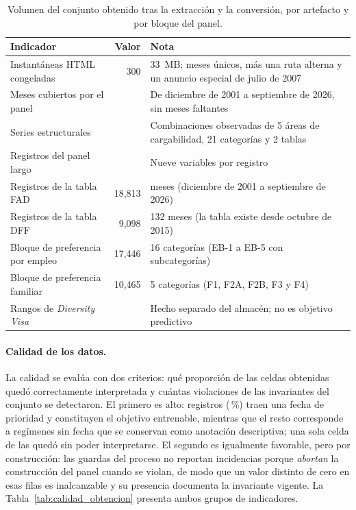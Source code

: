 \documentclass[12pt,letterpaper]{report}
\begin{document}
\begin{table}[H]
\centering
\footnotesize
\caption[Cantidad de datos obtenidos]{Volumen del conjunto obtenido tras la extracción y la
conversión, por artefacto y por bloque del panel.}
\label{tab:censo_obtencion}
\begin{tabular}{p{6.3cm}r p{6.0cm}}
\toprule
\rowcolor{uacjblue!15}
\textbf{Indicador} & \textbf{Valor} & \textbf{Nota} \\ \midrule
Instantáneas HTML congeladas & 300 & 33~MB; \factNMonths{} meses únicos, más una ruta alterna y un anuncio especial de julio de 2007 \\
Meses cubiertos por el panel & \factNMonths{} & De diciembre de 2001 a septiembre de 2026, sin meses faltantes \\
Series estructurales & \factNSeriesStructural{} & Combinaciones observadas de 5 áreas de cargabilidad, 21 categorías y 2 tablas \\
Registros del panel largo & \factNObsFmt{} & Nueve variables por registro \\
Registros de la tabla FAD & 18{,}813 & \factNMonths{} meses (diciembre de 2001 a septiembre de 2026) \\
Registros de la tabla DFF & 9{,}098 & 132 meses (la tabla existe desde octubre de 2015) \\
Bloque de preferencia por empleo & 17{,}446 & 16 categorías (EB-1 a EB-5 con subcategorías) \\
Bloque de preferencia familiar & 10{,}465 & 5 categorías (F1, F2A, F2B, F3 y F4) \\
Rangos de \textit{Diversity Visa} & \factDvNRowsFmt{} & Hecho separado del almacén; no es objetivo predictivo \\
\bottomrule
\end{tabular}
\end{table}

\paragraph{Calidad de los datos.} La calidad se evalúa con dos criterios: qué proporción de
las celdas obtenidas quedó correctamente interpretada y cuántas violaciones de las
invariantes del conjunto se detectaron. El primero es alto: \factNObsFFmt{} registros
(\factPctTrainableF{}\,\%) traen una fecha de prioridad y constituyen el objetivo entrenable,
mientras que el resto corresponde a regímenes sin fecha que se conservan como anotación
descriptiva; una sola celda de las \factNObsFmt{} quedó sin poder interpretarse. El segundo
es igualmente favorable, pero por construcción: las guardas del proceso no reportan
incidencias porque \textit{abortan} la construcción del panel cuando se violan, de modo que
un valor distinto de cero en esas filas es inalcanzable y su presencia documenta la
invariante vigente. La Tabla~\ref{tab:calidad_obtencion} presenta ambos grupos de
indicadores.
\end{document}
